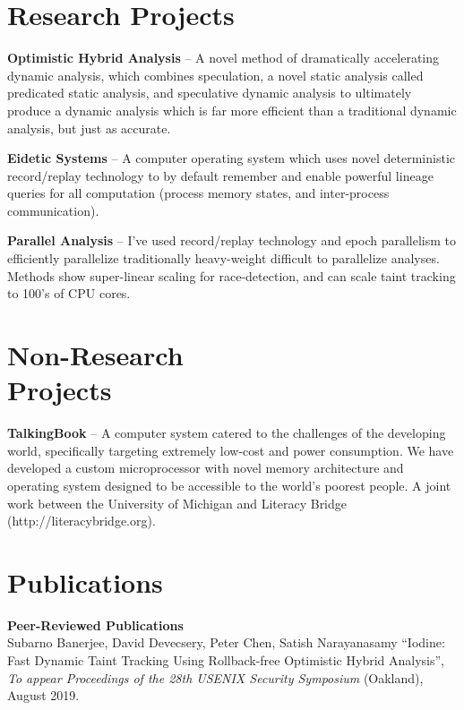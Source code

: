 \documentclass[margin, 10pt]{res} %
\begin{document}
\begin{resume}
\section{Research Projects}
\textbf{Optimistic Hybrid Analysis} -- A novel method of dramatically
accelerating dynamic analysis, which combines speculation, a novel
static analysis called predicated static analysis, and speculative
dynamic analysis to ultimately produce a dynamic analysis which is far
more efficient than a traditional dynamic analysis, but just as
accurate.

\textbf{Eidetic Systems} -- A computer operating system which uses
novel deterministic record/replay technology to by default remember
and enable powerful lineage queries for all computation (process
memory states, and inter-process communication).

\textbf{Parallel Analysis} -- I've used record/replay technology and
epoch parallelism to efficiently parallelize traditionally
heavy-weight difficult to parallelize analyses.  Methods show
super-linear scaling for race-detection, and can scale taint tracking
to 100's of CPU cores.



\section{Non-Research \\ Projects}
\textbf{TalkingBook} -- A computer system catered to the challenges of
the developing world, specifically targeting extremely low-cost and
power consumption.  We have developed a custom microprocessor with
novel memory architecture and operating system designed to be
accessible to the world's poorest people.  A joint work between the
University of Michigan and Literacy Bridge
(http://literacybridge.org).

\section{Publications}
\textbf{Peer-Reviewed Publications}\\
Subarno Banerjee, David Devecsery, Peter Chen, Satish Narayanasamy
``Iodine: Fast Dynamic Taint Tracking Using Rollback-free Optimistic
Hybrid Analysis'', {\sl To appear Proceedings of the 28th USENIX
Security Symposium} (Oakland), August 2019.


\end{resume}
\end{document}
